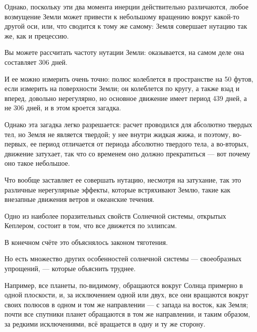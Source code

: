 \documentclass[10pt,oneside]{article}
\newcommand{\TipsSubsection}[1]{\par\vspace{6bp}{\normalsize\bfseries #1\par}\vspace{2bp}}
\begin{document}
Однако, поскольку эти два момента инерции действительно различаются, любое возмущение Земли может привести к небольшому вращению вокруг какой-то другой оси, или, что сводится к тому же самому: Земля совершает нутацию так же, как и прецессию.\par

Вы можете рассчитать частоту нутации Земли: оказывается, на самом деле она составляет 306 дней.\par

И ее можно измерить очень точно: полюс колеблется в пространстве на 50 футов, если измерить на поверхности Земли; он колеблется по кругу, а также взад и вперед, довольно нерегулярно, но основное движение имеет период 439 дней, а не 306 дней, и в этом кроется загадка.\par

Однако эта загадка легко разрешается: расчет проводился для абсолютно твердых тел, но Земля не является твердой; у нее внутри жидкая жижа, и поэтому, во-первых, ее период отличается от периода абсолютно твердого тела, а во-вторых, движение затухает, так что со временем оно должно прекратиться --- вот почему оно такое небольшое.\par

Что вообще заставляет ее совершать нутацию, несмотря на затухание, так это различные нерегулярные эффекты, которые встряхивают Землю, такие как внезапные движения ветров и океанские течения.\par

\TipsSubsection{4-12 Момент количества движения в астрономии}

Одно из наиболее поразительных свойств Солнечной системы, открытых Кеплером, состоит в том, что все движется по эллипсам.\par

В конечном счёте это объяснялось законом тяготения.\par

Но есть множество других особенностей солнечной системы --- своеобразных упрощений, --- которые объяснить труднее.\par

Например, все планеты, по-видимому, обращаются вокруг Солнца примерно в одной плоскости, и, за исключением одной или двух, все они вращаются вокруг своих полюсов в одном и том же направлении --- с запада на восток, как Земля; почти все спутники планет обращаются в том же направлении, и таким образом, за редкими исключениями, всё вращается в одну и ту же сторону.\par
\end{document}
